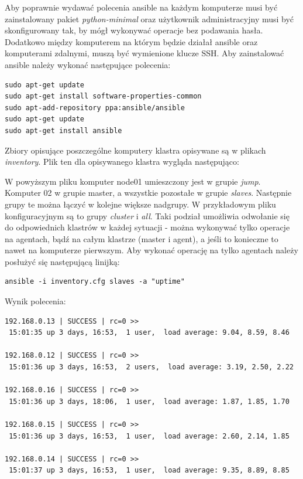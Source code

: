 \documentclass[10pt,a4paper,titlepage,twoside]{report}
\begin{document}
Aby poprawnie wydawać polecenia ansible na każdym komputerze musi być zainstalowany pakiet \textit{python-minimal} oraz użytkownik administracyjny musi być skonfigurowany tak, by mógł wykonywać operacje bez podawania hasła. Dodatkowo między komputerem na którym będzie działał ansible oraz komputerami zdalnymi, muszą być wymienione klucze SSH. Aby zainstalować ansible należy wykonać następujące polecenia:

\begin{lstlisting}
sudo apt-get update
sudo apt-get install software-properties-common
sudo apt-add-repository ppa:ansible/ansible
sudo apt-get update
sudo apt-get install ansible
\end{lstlisting}

Zbiory opisujące poszczególne komputery klastra opisywane są w plikach \textit{inventory}. Plik ten dla opisywanego klastra wygląda następująco:


W powyższym pliku komputer node01 umieszczony jest w grupie \textit{jump}. Komputer 02 w grupie master, a wszystkie pozostałe w grupie \textit{slaves}. Następnie grupy te można łączyć w kolejne większe nadgrupy. W przykładowym pliku konfiguracyjnym są to grupy \textit{cluster} i \textit{all}. Taki podział umożliwia odwołanie się do odpowiednich klastrów w każdej sytuacji - można wykonywać tylko operacje na agentach, bądź na całym klastrze (master i agent), a jeśli to konieczne to nawet na komputerze pierwszym. Aby wykonać operację na tylko agentach należy posłużyć się następującą linijką:

\begin{lstlisting}
ansible -i inventory.cfg slaves -a "uptime"
\end{lstlisting}

Wynik polecenia:

\begin{lstlisting}
192.168.0.13 | SUCCESS | rc=0 >>                                                                                                                      
 15:01:35 up 3 days, 16:53,  1 user,  load average: 9.04, 8.59, 8.46
 
192.168.0.12 | SUCCESS | rc=0 >>                                                                                                                      
 15:01:36 up 3 days, 16:53,  2 users,  load average: 3.19, 2.50, 2.22
 
192.168.0.16 | SUCCESS | rc=0 >>                                                                                                                      
 15:01:36 up 3 days, 18:06,  1 user,  load average: 1.87, 1.85, 1.70
 
192.168.0.15 | SUCCESS | rc=0 >>                                                                                                                      
 15:01:36 up 3 days, 16:53,  1 user,  load average: 2.60, 2.14, 1.85
 
192.168.0.14 | SUCCESS | rc=0 >>                                                                                                                      
 15:01:37 up 3 days, 16:53,  1 user,  load average: 9.35, 8.89, 8.85
\end{lstlisting}
\end{document}

